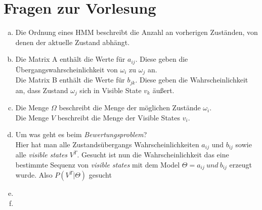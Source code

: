 \documentclass[a4paper]{scrartcl}
\begin{document}
\section{Fragen zur Vorlesung}

\begin{enumerate}[(a)]
	\item Die Ordnung eines HMM beschreibt die Anzahl an vorherigen Zuständen, von denen der aktuelle Zustand abhängt.
	
	\item Die Matrix A enthält die Werte für $a_{ij}$. Diese geben die Übergangswahrscheinlichkeit von $\omega_i$ zu $\omega_j$ an.\\
	
	Die Matrix B enthält die Werte für $b_{jk}$. Diese geben die Wahrscheinlichkeit an, dass Zustand $\omega_j$ sich in Visible State $v_k$ äußert.\\
	
	\item Die Menge $\Omega$ beschreibt die Menge der möglichen Zustände $\omega_i$.\\
	
	Die Menge $V$ beschreibt die Menge der Visible States $v_i$.
	\item Um was geht es beim \textit{Bewertungsproblem}? \\
Hier hat man alle Zustandsübergangs Wahrscheinlichkeiten $a_{ij}$ und $b_{ij}$  sowie alle \textit{visible states} $V^T$. Gesucht ist nun die Wahrscheinlichkeit das eine bestimmte Sequenz von \textit{visible states} mit dem Model $\Theta =   a_{ij}\ und\ b_{ij}$ erzeugt wurde. Also $P(V^T|\Theta)$ gesucht
	\item 
	\item 
\end{enumerate}
\end{document}
